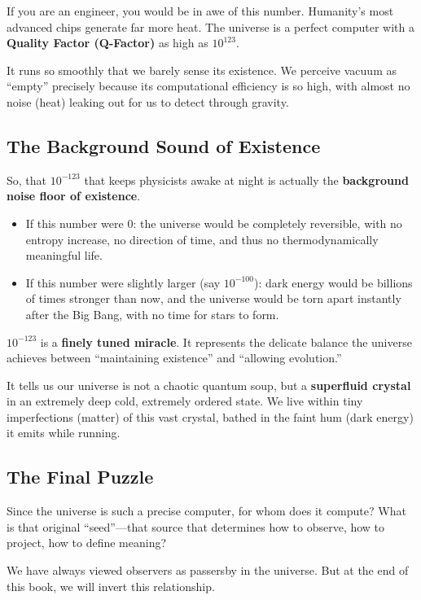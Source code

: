 \documentclass[11pt,a4paper,twoside]{book}
\begin{document}
If you are an engineer, you would be in awe of this number. Humanity's most advanced chips generate far more heat. The universe is a perfect computer with a \textbf{Quality Factor (Q-Factor)} as high as $10^{123}$.

It runs so smoothly that we barely sense its existence. We perceive vacuum as ``empty'' precisely because its computational efficiency is so high, with almost no noise (heat) leaking out for us to detect through gravity.

\subsection{The Background Sound of Existence}

So, that $10^{-123}$ that keeps physicists awake at night is actually the \textbf{background noise floor of existence}.

\begin{itemize}
\item If this number were 0: the universe would be completely reversible, with no entropy increase, no direction of time, and thus no thermodynamically meaningful life.

\item If this number were slightly larger (say $10^{-100}$): dark energy would be billions of times stronger than now, and the universe would be torn apart instantly after the Big Bang, with no time for stars to form.
\end{itemize}

$10^{-123}$ is a \textbf{finely tuned miracle}. It represents the delicate balance the universe achieves between ``maintaining existence'' and ``allowing evolution.''

It tells us our universe is not a chaotic quantum soup, but a \textbf{superfluid crystal} in an extremely deep cold, extremely ordered state. We live within tiny imperfections (matter) of this vast crystal, bathed in the faint hum (dark energy) it emits while running.

\subsection{The Final Puzzle}

Since the universe is such a precise computer, for whom does it compute? What is that original ``seed''---that source that determines how to observe, how to project, how to define meaning?

We have always viewed observers as passersby in the universe. But at the end of this book, we will invert this relationship.
\end{document}
